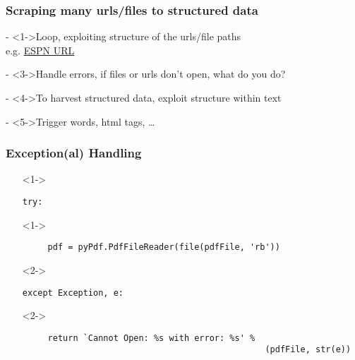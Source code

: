\documentclass[compress, black]{beamer}
\begin{document}
\begin{frame}[fragile]
	\frametitle{Scraping many urls/files to structured data}
	\begin{large_enum}
		\item[-]<1->Loop, exploiting structure of the urls/file paths\\\normalsize \pause
					 e.g. \href{http://search.espncricinfo.com/ci/content/match/search.html?search=odi;all=1;page=1}{ESPN URL}
		\item[-]<3->Handle errors, if files or urls don't open, what do you do?
		\item[-]<4->To harvest structured data, exploit structure within text
		\item[-]<5->Trigger words, html tags, \ldots 
	\end{large_enum}
\end{frame}

\begin{frame}[fragile]
	\frametitle{Exception(al) Handling}
	\begin{enumerate}
		\item[]<1->\begin{verbatim}try: \end{verbatim}
		\item[]<1->\begin{verbatim}     pdf = pyPdf.PdfFileReader(file(pdfFile, 'rb')) \end{verbatim}
		\item[]<2->\begin{verbatim}except Exception, e:\end{verbatim}
		\item[]<2->\begin{verbatim}     return `Cannot Open: %s with error: %s' % 
												(pdfFile, str(e))\end{verbatim}
	\end{enumerate}
\end{frame}
\end{document}

